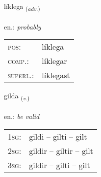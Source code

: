 \documentclass[frontgrid, backgrid]{flacards}\usepackage[]{graphicx}\usepackage[]{xcolor}
\begin{document}
\renewcommand{\flhead}{\vskip5pt \fboxsep=0pt {\small\bfseries\footnotesize Atviksorð | Adverb}}
\renewcommand{\fcfoot}{\vskip5pt \fboxsep=0pt \hspace{2pt}{\small\bfseries\footnotesize 1K}}

\renewcommand{\blhead}{\vskip5pt {\small\bfseries\footnotesize Atviksorð | Adverb }}
\renewcommand{\bcfoot}{\vskip5pt \hspace{2pt}{\small\bfseries\footnotesize 1K}}


{líklega \small{\textsubscript{(\textit{adv.})}} \\[1ex] %
\textphonetic{[lihklɛɣa]} \\
en.: \emph{probably} \\  [2ex]
\renewcommand*{\arraystretch}{0.8}
\begin{tabular}{ll}
\textsc{pos}: & líklega \\ 
\textsc{comp.}: & líklegar \\ 
\textsc{superl.}: & líklegast \\
\end{tabular}
}

\renewcommand{\flhead}{\vskip5pt \fboxsep=0pt {\small\bfseries\footnotesize Sagnorð | Verb}}
\renewcommand{\fcfoot}{\vskip5pt \fboxsep=0pt \hspace{2pt}{\small\bfseries\footnotesize 1K}}

\renewcommand{\blhead}{\vskip5pt {\small\bfseries\footnotesize Sagnorð | Verb }}
\renewcommand{\bcfoot}{\vskip5pt \hspace{2pt}{\small\bfseries\footnotesize 1K}}


{gilda \small{\textsubscript{(\textit{v.})}} \\[1ex] %
\textphonetic{[cɪlta]} \\
en.: \emph{be valid} \\  [2ex]
\renewcommand*{\arraystretch}{0.8}
\begin{tabular}{p{1cm}l}
\textsc{1sg}: & gildi -- gilti -- gilt \\ 
\textsc{2sg}: & gildir -- giltir -- gilt \\ 
\textsc{3sg}: & gildir -- gilti -- gilt \\ 
\end{tabular}
}
\end{document}
